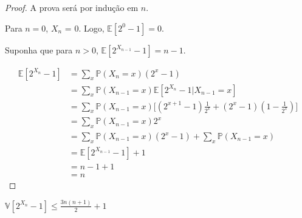 \begin{proof}
A prova será por indução em $n$. 

Para $n = 0$, $X_n$ = 0. Logo, $\mathbb{E}[2^0 - 1] = 0$.

Suponha que para $n > 0$, $\mathbb{E}[2^{X_{n-1}} - 1] = n-1$.

\begin{align*}
  \mathbb{E}[2^{X_n} - 1] 
    &= \sum_{x} \mathbb{P} (X_n = x) (2^x - 1) \\
    &= \sum_{x} \mathbb{P} (X_{n-1} = x) \mathbb{E}[2^{X_n} - 1 | X_{n-1} = x] \\
    &= \sum_{x} \mathbb{P} (X_{n-1} = x) \Big[ (2^{x+1} - 1) \frac{1}{2^x} +  (2^x - 1) (1 - \frac{1}{2^x}) \Big] \\
    &= \sum_{x} \mathbb{P} (X_{n-1} = x) 2^x \\
    &= \sum_{x} \mathbb{P} (X_{n-1} = x) (2^x - 1) + \sum_{x} \mathbb{P} (X_{n-1} = x) \\
    &= \mathbb{E}[2^{X_{n-1}} - 1] + 1 \\
    &= n - 1 + 1 \\
    &= n
\end{align*}

\end{proof}

\begin{lemma} \label{morris:variance}
$\mathbb{V}[2^{X_n} - 1] \leq \frac{3n(n+1)}{2} + 1$
\end{lemma}

